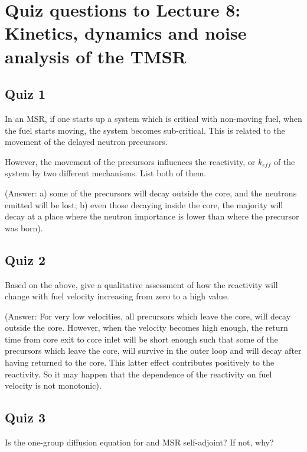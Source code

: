\documentclass[openright, 12pt, a4paper, twoside, onecolumn]{book}
\newcommand*{\smallspace}{\vspace{0.5cm}}
\begin{document}
\chapter*{Quiz questions to Lecture 8:\\
Kinetics, dynamics and noise analysis of the TMSR}

\section*{Quiz 1}

In an MSR, if one starts up a system which is critical with non-moving fuel, when the fuel starts moving, the system becomes sub-critical. This is related to the movement of the delayed neutron precursors. 
\smallspace

However, the movement of the precursors influences the reactivity, or $k_{eff}$ of the system by two different mechanisms. List both of them.
\smallspace

(Answer: a) some of the precursors will decay outside the core, and the neutrons emitted will be lost; b) even those decaying inside the core, the majority will decay at a place where the neutron importance is lower than where the precursor was born).

\section*{Quiz 2}

Based on the above, give a qualitative assessment of how the reactivity will change with fuel velocity increasing from zero to a high value.
\smallspace

(Answer: For very low velocities, all precursors which leave the core, will decay outside the core. However, when the velocity becomes high enough, the return time from core exit to core inlet will be short enough such that some of the precursors which leave the core, will survive in the outer loop and will decay after having returned to the core. This latter effect contributes positively to the reactivity. So it may happen that the dependence of the reactivity on fuel velocity is not monotonic).  

\section*{Quiz 3}

Is the one-group diffusion equation for and MSR self-adjoint? If not, why?
\smallspace
\end{document}

